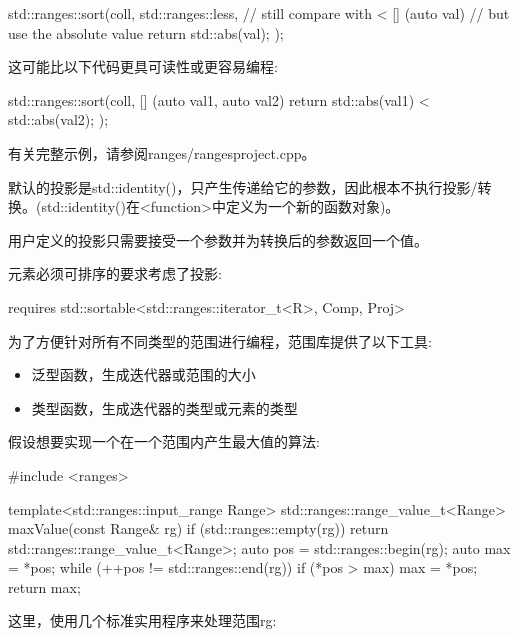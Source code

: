 \begin{cpp}
std::ranges::sort(coll,
				std::ranges::less{}, // still compare with <
				[] (auto val) { // but use the absolute value
					return std::abs(val);
				});
\end{cpp}

这可能比以下代码更具可读性或更容易编程:

\begin{cpp}
std::ranges::sort(coll,
				[] (auto val1, auto val2) {
					return std::abs(val1) < std::abs(val2);
				});
\end{cpp}

有关完整示例，请参阅ranges/rangesproject.cpp。

默认的投影是std::identity()，只产生传递给它的参数，因此根本不执行投影/转换。(std::identity()在<function>中定义为一个新的函数对象)。

用户定义的投影只需要接受一个参数并为转换后的参数返回一个值。

元素必须可排序的要求考虑了投影:

\begin{cpp}
requires std::sortable<std::ranges::iterator_t<R>, Comp, Proj>
\end{cpp}


为了方便针对所有不同类型的范围进行编程，范围库提供了以下工具:

\begin{itemize}
\item
泛型函数，生成迭代器或范围的大小

\item
类型函数，生成迭代器的类型或元素的类型
\end{itemize}

假设想要实现一个在一个范围内产生最大值的算法:


\begin{cpp}
#include <ranges>

template<std::ranges::input_range Range>
std::ranges::range_value_t<Range> maxValue(const Range& rg)
{
	if (std::ranges::empty(rg)) {
		return std::ranges::range_value_t<Range>{};
	}
	auto pos = std::ranges::begin(rg);
	auto max = *pos;
	while (++pos != std::ranges::end(rg)) {
		if (*pos > max) {
			max = *pos;
		}
	}
	return max;
}
\end{cpp}

这里，使用几个标准实用程序来处理范围rg:

